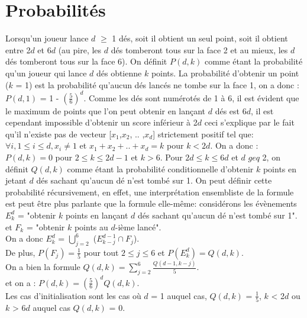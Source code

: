 \documentclass[12pt]{article}
\begin{document}
\newpage
\section{Probabilités}
Lorsqu'un joueur lance $d$ $\geq$ 1 dés, soit il obtient un seul point, soit il obtient entre 2$d$ et 6$d$ (au pire, les $d$ dés tomberont tous sur la face 2 et au mieux, les $d$ dés tomberont tous sur la face 6).
\newline
On définit $P(d,k)$ comme étant la probabilité qu'un joueur qui lance $d$ dés obtienne $k$ points.
La probabilité d'obtenir un point ($k$ = 1) est la probabilité qu'aucun dés lancés ne tombe sur la face 1, on a donc : $P(d,1)$ = 1 - $\left(\frac{5}{6}\right)^d$.
\newline
Comme les dés sont numérotés de 1 à 6, il est évident que le maximum de points que l'on peut obtenir en lançant $d$ dés est 6$d$, il est cependant impossible d'obtenir un score inférieur à 2$d$ ceci s'explique par le fait qu'il n'existe pas de vecteur [$x_1$,$x_2$, .. ,$x_d$] strictement positif tel que:
\newline
$\forall i, 1 \leq i \leq d, x_i \neq 1$ et $x_1+x_2+ .. +x_d = k$ pour $k < 2d$. 
\newline
On a donc : $P(d,k) = 0$ pour $2 \leq k \leq 2d-1$ et $k > 6$.
Pour $2d \leq k \leq 6d$ et $d$ $geq$ 2, on définit $Q(d,k)$ comme étant la probabilité conditionnelle d'obtenir $k$ points en jetant $d$ dés sachant qu'aucun dé n'est tombé sur 1.
On peut définir cette probabilité récursivement, en effet, une interprétation ensembliste de la formule est peut être plus parlante que la formule elle-même:
\newline
considérons les évènements $E_k^d$ = "obtenir $k$ points en lançant $d$ dés sachant qu'aucun dé n'est tombé sur 1".
\newline
et $F_k$ = "obtenir $k$ points au $d$-ième lancé".
\\
\newline
On a donc $E_k^d$ = $\bigcup_{j=2}^{6}$ ($E_{k-j}^{d-1} \cap F_j$).
\newline
\\
De plus,
$P(F_j) = \frac{1}{5}$ pour tout $2 \leq j \leq 6$ et $P(E_k^d) = Q(d,k)$.
\newline
\\
On a bien la formule $Q(d,k) = \sum_{j=2}^6 \frac{Q(d-1,k-j)}{5}$.
\\
et on a : $P(d,k) = \left(\frac{5}{6}\right)^d Q(d,k)$.
\newline
\\
Les cas d'initialisation sont les cas où $d$ = 1 auquel cas, $Q(d,k)$ = $\frac{1}{5}$, $k$ < 2$d$ ou $k$ > 6$d$ auquel cas $Q(d,k)$ = 0.
\end{document}
